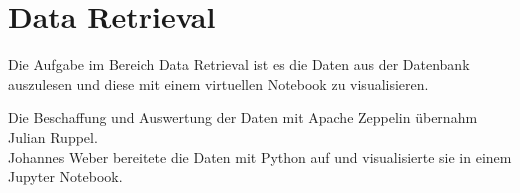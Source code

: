 \section{Data Retrieval}
Die Aufgabe im Bereich Data Retrieval ist es die Daten aus der Datenbank auszulesen und diese mit einem virtuellen Notebook zu visualisieren.

Die Beschaffung und Auswertung der Daten mit Apache Zeppelin übernahm Julian Ruppel.\\
Johannes Weber bereitete die Daten mit Python auf und visualisierte sie in einem Jupyter Notebook.



